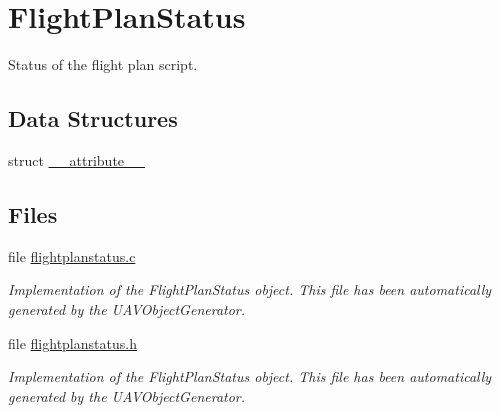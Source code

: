 \hypertarget{group___flight_plan_status}{\section{\-Flight\-Plan\-Status}
\label{group___flight_plan_status}
}


\-Status of the flight plan script.  


\subsection*{\-Data \-Structures}
\begin{DoxyCompactItemize}
\item 
struct \hyperlink{struct____attribute____}{\-\_\-\-\_\-attribute\-\_\-\-\_\-}
\end{DoxyCompactItemize}
\subsection*{\-Files}
\begin{DoxyCompactItemize}
\item 
file \hyperlink{flightplanstatus_8c}{flightplanstatus.\-c}
\begin{DoxyCompactList}\small\item\em \-Implementation of the \-Flight\-Plan\-Status object. \-This file has been automatically generated by the \-U\-A\-V\-Object\-Generator. \end{DoxyCompactList}\item 
file \hyperlink{flightplanstatus_8h}{flightplanstatus.\-h}
\begin{DoxyCompactList}\small\item\em \-Implementation of the \-Flight\-Plan\-Status object. \-This file has been automatically generated by the \-U\-A\-V\-Object\-Generator. \end{DoxyCompactList}\end{DoxyCompactItemize}
